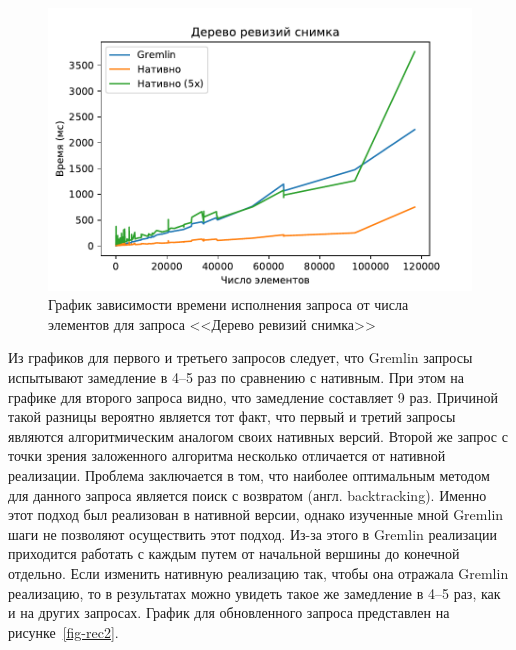 \documentclass[times,specification,annotation]{itmo-student-thesis}
\begin{document}
\begin{figure}[!h]
\caption{График зависимости времени исполнения запроса от числа элементов для запроса <<Дерево ревизий снимка>>}\label{fig-snp}
\centering
\includegraphics{img/snp-plot.pdf}
\end{figure}

Из графиков для первого и третьего запросов следует, что Gremlin запросы испытывают замедление в 4--5 раз по сравнению с нативным.
При этом на графике для второго запроса видно, что замедление составляет 9 раз. Причиной такой разницы вероятно является тот факт, что первый и третий запросы являются алгоритмическим аналогом своих нативных версий. Второй же запрос с точки зрения заложенного алгоритма несколько отличается от нативной реализации. Проблема заключается в том, что наиболее оптимальным методом для данного запроса является поиск с возвратом (англ. backtracking). Именно этот подход был реализован в нативной версии, однако изученные мной Gremlin шаги не позволяют осуществить этот подход. Из-за этого в Gremlin реализации приходится работать с каждым путем от начальной вершины до конечной отдельно. Если изменить нативную реализацию так, чтобы она отражала Gremlin реализацию, то в результатах можно увидеть такое же замедление в 4--5 раз, как и на других запросах. График для обновленного запроса представлен на рисунке~\ref{fig-rec2}.
\end{document}

